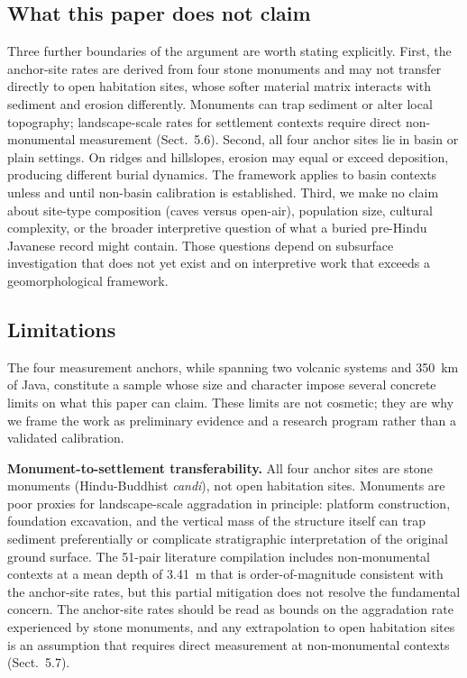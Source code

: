 \documentclass[12pt,a4paper]{article}
\begin{document}
\subsection{What this paper does not claim}

Three further boundaries of the argument are worth stating explicitly. First, the anchor-site rates are derived from four stone monuments and may not transfer directly to open habitation sites, whose softer material matrix interacts with sediment and erosion differently. Monuments can trap sediment or alter local topography; landscape-scale rates for settlement contexts require direct non-monumental measurement (Sect.~5.6). Second, all four anchor sites lie in basin or plain settings. On ridges and hillslopes, erosion may equal or exceed deposition, producing different burial dynamics. The framework applies to basin contexts unless and until non-basin calibration is established. Third, we make no claim about site-type composition (caves versus open-air), population size, cultural complexity, or the broader interpretive question of what a buried pre-Hindu Javanese record might contain. Those questions depend on subsurface investigation that does not yet exist and on interpretive work that exceeds a geomorphological framework.

\subsection{Limitations}

The four measurement anchors, while spanning two volcanic systems and 350~km of Java, constitute a sample whose size and character impose several concrete limits on what this paper can claim. These limits are not cosmetic; they are why we frame the work as preliminary evidence and a research program rather than a validated calibration.

\textbf{Monument-to-settlement transferability.} All four anchor sites are stone monuments (Hindu-Buddhist \textit{candi}), not open habitation sites. Monuments are poor proxies for landscape-scale aggradation in principle: platform construction, foundation excavation, and the vertical mass of the structure itself can trap sediment preferentially or complicate stratigraphic interpretation of the original ground surface. The 51-pair literature compilation includes non-monumental contexts at a mean depth of 3.41~m that is order-of-magnitude consistent with the anchor-site rates, but this partial mitigation does not resolve the fundamental concern. The anchor-site rates should be read as bounds on the aggradation rate experienced by stone monuments, and any extrapolation to open habitation sites is an assumption that requires direct measurement at non-monumental contexts (Sect.~5.7).
\end{document}
